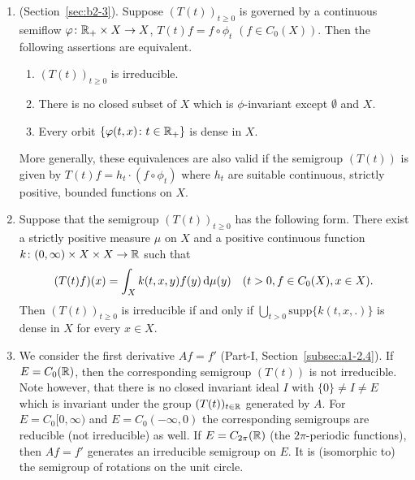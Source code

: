\begin{examples}\label{ex:b3-3.4}
%
	
\begin{enumerate}[\upshape (i), wide, labelindent=.25em]
	\item 
	(\cf Section~\ref{sec:b2-3}). Suppose $(T(t))_{t\geq 0}$ is governed by a continuous semiflow
     $\phi \colon \R_{+} \times X \to X$, \ie $T(t)f = f\circ\phi_{t}$ $(f\in C_{0}(X))$.
	Then the following assertions are equivalent.
	\begin{enumerate}[\upshape (a)]
		\item 
		$(T(t))_{t\geq 0}$ is irreducible.
	
		\item 
		There is no closed subset of\/ $X$ which is $\phi$-invariant except $\emptyset$ and $X$.
	
		\item 
		Every orbit $\{\phi(t,x) \colon t \in \R_{+}\}$ is dense in $X$.
	\end{enumerate}
	More generally, these equivalences are also valid if the semigroup $(T(t))$ is given by $T(t)f = h_{t}\cdot(f\circ\phi_{t})$ where $h_{t}$ are suitable continuous, strictly positive, bounded functions on $X$.
	
	\item 
	Suppose that the semigroup $(T(t))_{t\geq 0}$ has the following form. 
    There exist a strictly positive measure $\mu$ on $X$ and a positive continuous function $k \colon (0,\infty) \times X \times X \to \mathbb{R}$ such that
	\begin{equation}\label{eq:b3-3.1}
		(T(t)f)(x) = \int_{X} k(t,x,y)f(y) \mathop{}\!\mathrm{d}{\mu}(y) \quad (t > 0, f \in C_{0}(X), x \in X).		
	\end{equation}	
	Then $(T(t))_{t\geq 0}$ is irreducible if and only if\/ $\bigcup_{t>0}\text{supp}\{k(t,x,.)\}$ is dense in $X$ for every $x \in X$.
	
	\item 
	We consider the first derivative $Af = f'$ (\cf Part-I, Section~\ref{subsec:a1-2.4}). 
    If\/ $E = C_{0}(\mathbb{R})$, then the corresponding semigroup $(T(t))$ is not irreducible.
	Note however, that there is no closed invariant ideal $I$ with $\{0\} \neq I \neq E$ which is invariant under the group $(T(t))_{t\in\mathbb{R}}$ generated by $A$.
	For $E = C_{0}[0,\infty)$ and $E = C_{0}(-\infty,0)$ the corresponding semigroups are reducible (\ie not irreducible) as well.
	If\/ $E = C_{2\pi}(\mathbb{R})$ (\ie the $2\pi$-periodic functions), then $Af = f'$ generates an irreducible semigroup on $E$.
	It is (isomorphic to) the semigroup of rotations on the unit circle.
    

\end{enumerate}
\end{examples}
